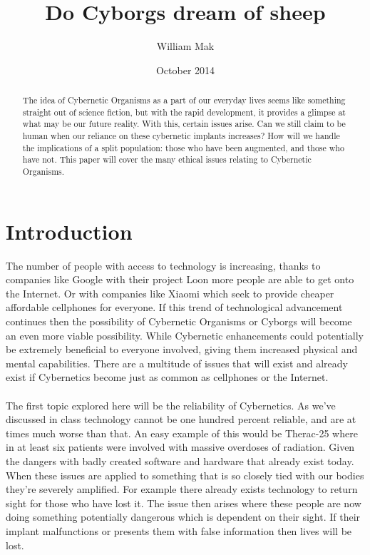 \documentclass[12pt,a4paper,notitlepage]{article}
\title{Do Cyborgs dream of sheep}
\author{William Mak}
\date{October 2014}
\begin{document}
\maketitle
\begin{abstract}
	The idea of Cybernetic Organisms as a part of our everyday lives seems like
something straight out of science fiction, but with the rapid development, it
provides a glimpse at what may be our future reality. With this, certain issues
arise. Can we still claim to be human when our reliance on these cybernetic
implants increases? How will we handle the implications of a split population:
those who have been augmented, and those who have not. This paper will cover the
many ethical issues relating to Cybernetic Organisms.
\end{abstract}

\section{Introduction}
    The number of people with access to technology is increasing, thanks to
companies like Google with their project Loon more people are able to get onto
the Internet. Or with companies like Xiaomi which seek to provide cheaper
affordable cellphones for everyone. If this trend of technological advancement
continues then the possibility of Cybernetic Organisms or Cyborgs will become an
even more viable possibility. While Cybernetic enhancements could potentially be
extremely beneficial to everyone involved, giving them increased physical and
mental capabilities. There are a multitude of issues that will exist and already
exist if Cybernetics become just as common as cellphones or the Internet.
\\\\
    The first topic explored here will be the reliability of Cybernetics. As
we've discussed in class technology cannot be one hundred percent reliable, and 
are at times much worse than that. An easy example of this would be Therac-25
where in at least six patients were involved with massive overdoses of radiation.
Given the dangers with badly created software and hardware that already exist
today. When these issues are applied to something that is so closely tied with
our bodies they're severely amplified. For example there already exists
technology to return sight for those who have lost it. The issue then arises 
where these people are now doing something potentially dangerous which is
dependent on their sight. If their implant malfunctions or presents them with 
false information then lives will be lost.
\end{document}
